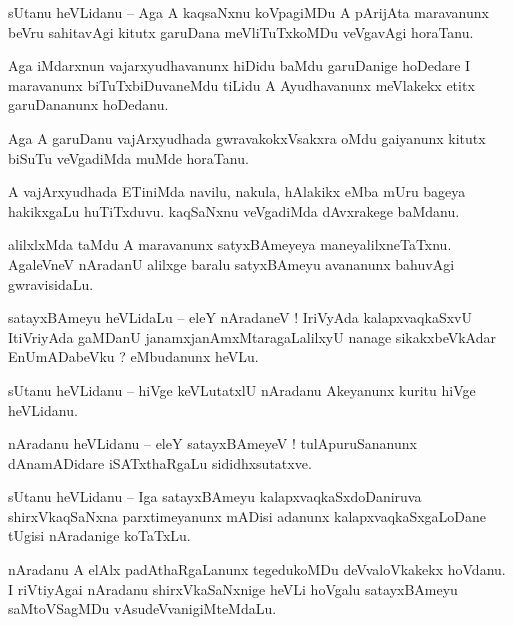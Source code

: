 \documentclass{article}
\begin{document}
\begin{mn}%
sUtanu heVLidanu -- Aga A kaqsaNxnu koVpagiMDu A pArijAta maravanunx beVru sahitavAgi kitutx 
garuDana meVliTuTxkoMDu veVgavAgi horaTanu.
\end{mn}

\begin{mn}%
Aga iMdarxnun vajarxyudhavanunx hiDidu baMdu garuDanige hoDedare I maravanunx biTuTxbiDuvaneMdu 
tiLidu A Ayudhavanunx meVlakekx etitx garuDananunx hoDedanu.
\end{mn}

\begin{mn}%
Aga A garuDanu vajArxyudhada gwravakokxVsakxra oMdu gaiyanunx kitutx biSuTu veVgadiMda muMde horaTanu.
\end{mn}

\begin{mn}%
A vajArxyudhada ETiniMda navilu, nakula, hAlakikx eMba mUru bageya hakikxgaLu huTiTxduvu. kaqSaNxnu 
veVgadiMda dAvxrakege baMdanu.
\end{mn}

\begin{mn}%
alilxlxMda taMdu A maravanunx satyxBAmeyeya maneyalilxneTaTxnu. AgaleVneV nAradanU alilxge baralu 
satyxBAmeyu avananunx bahuvAgi gwravisidaLu.
\end{mn}

\begin{mn}%
satayxBAmeyu heVLidaLu -- eleY nAradaneV ! IriVyAda kalapxvaqkaSxvU ItiVriyAda gaMDanU 
janamxjanAmxMtaragaLalilxyU nanage sikakxbeVkAdar EnUmADabeVku ? eMbudanunx heVLu.
\end{mn}

\begin{mn}%
sUtanu heVLidanu -- hiVge keVLutatxlU nAradanu Akeyanunx kuritu hiVge heVLidanu.
\end{mn}

\begin{mn}%
nAradanu heVLidanu -- eleY satayxBAmeyeV ! tulApuruSananunx dAnamADidare iSATxthaRgaLu 
sididhxsutatxve.
\end{mn}

\begin{mn}%
sUtanu heVLidanu -- Iga satayxBAmeyu kalapxvaqkaSxdoDaniruva shirxVkaqSaNxna parxtimeyanunx mADisi 
adanunx kalapxvaqkaSxgaLoDane tUgisi nAradanige koTaTxLu.
\end{mn}

\begin{mn}%
nAradanu A elAlx padAthaRgaLanunx tegedukoMDu deVvaloVkakekx hoVdanu. I riVtiyAgai nAradanu 
shirxVkaSaNxnige heVLi hoVgalu satayxBAmeyu saMtoVSagMDu vAsudeVvanigiMteMdaLu.
\end{mn}
\end{document}
